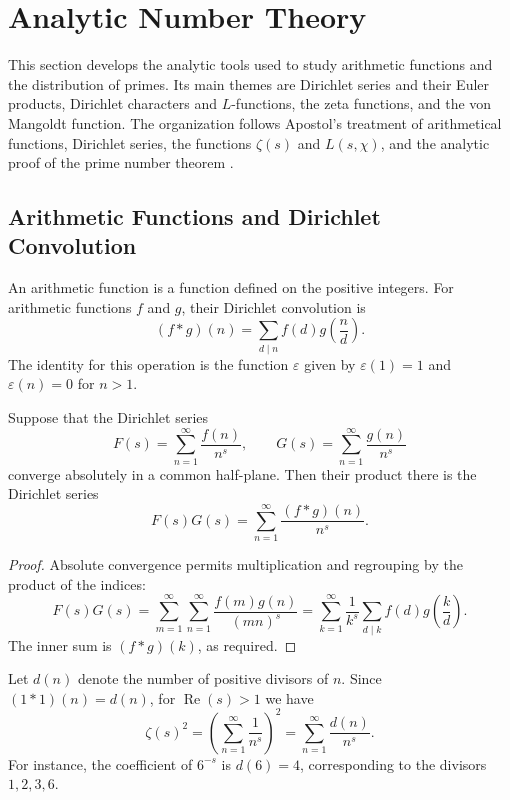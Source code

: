 \section{Analytic Number Theory}

This section develops the analytic tools used to study arithmetic functions and the distribution of primes. Its main themes are Dirichlet series and their Euler products, Dirichlet characters and $L$-functions, the zeta functions, and the von Mangoldt function. The organization follows Apostol's treatment of arithmetical functions, Dirichlet series, the functions $\zeta(s)$ and $L(s,\chi)$, and the analytic proof of the prime number theorem \cite[Chapters 2--4, 6--7, and 11--13]{Apostol1976-xj}.

\subsection{Arithmetic Functions and Dirichlet Convolution}

\begin{definition}
An arithmetic function is a function defined on the positive integers. For arithmetic functions $f$ and $g$, their Dirichlet convolution is
\[
 (f*g)(n)=\sum_{d\mid n}f(d)g\!\left(\frac{n}{d}\right).
\]
The identity for this operation is the function $\varepsilon$ given by $\varepsilon(1)=1$ and $\varepsilon(n)=0$ for $n>1$.
\end{definition}

\begin{theorem}
Suppose that the Dirichlet series
\[
 F(s)=\sum_{n=1}^{\infty}\frac{f(n)}{n^s},
 \qquad
 G(s)=\sum_{n=1}^{\infty}\frac{g(n)}{n^s}
\]
converge absolutely in a common half-plane. Then their product there is the Dirichlet series
\[
 F(s)G(s)=\sum_{n=1}^{\infty}\frac{(f*g)(n)}{n^s}.
\]
\end{theorem}

\begin{proof}
Absolute convergence permits multiplication and regrouping by the product of the indices:
\[
 F(s)G(s)=\sum_{m=1}^{\infty}\sum_{n=1}^{\infty}
 \frac{f(m)g(n)}{(mn)^s}
 =\sum_{k=1}^{\infty}\frac{1}{k^s}\sum_{d\mid k}f(d)g\!\left(\frac{k}{d}\right).
\]
The inner sum is $(f*g)(k)$, as required.
\end{proof}

\begin{example}
Let $d(n)$ denote the number of positive divisors of $n$. Since $(1*1)(n)=d(n)$, for $\operatorname{Re}(s)>1$ we have
\[
 \zeta(s)^2=\left(\sum_{n=1}^{\infty}\frac{1}{n^s}\right)^2
 =\sum_{n=1}^{\infty}\frac{d(n)}{n^s}.
\]
For instance, the coefficient of $6^{-s}$ is $d(6)=4$, corresponding to the divisors $1,2,3,6$.
\end{example}

